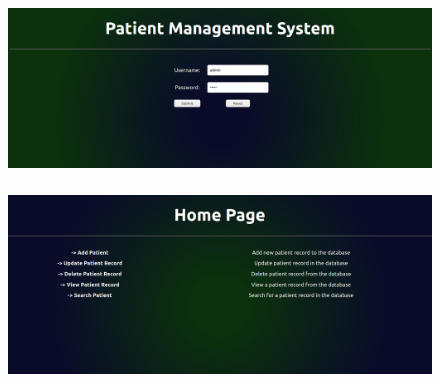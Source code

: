 \documentclass[12pt,letterpaper]{article}
\begin{document}
\subsubsection*{}
\begin{figure}[h]
    \centering
    \includegraphics[width = \textwidth]{Pics/login.png}
\end{figure}

\subsubsection*{}
\begin{figure}[h!]
    \centering
    \includegraphics[width = \textwidth]{Pics/home.png}
\end{figure}
\newpage
\end{document}
